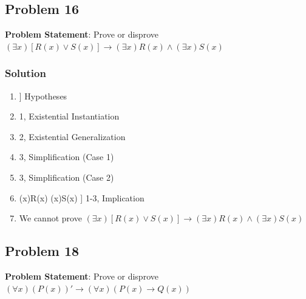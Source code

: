 \documentclass[12pt]{article}
\begin{document}
\subsection*{Problem 16}
\textbf{Problem Statement}: Prove or disprove \( (\exists x)[R(x)\lor S(x)]\rightarrow (\exists x)R(x)\land (\exists x)S(x) \)

\subsubsection*{Solution}
\begin{enumerate}[left=0em,labelwidth=4em,align=left]
    \item[\( (\exists x)[R(x) \lor S(x)] \)] \hfill Hypotheses
    \item[\( R(a) \lor S(a) \)] \hfill 1, Existential Instantiation
    \item[\( (\exists x)R(x) \lor (\exists x)S(x) \)] \hfill 2, Existential Generalization

    \item[\( (\exists x)R(x) \)] \hfill 3, Simplification (Case 1)
    \item[\( (\exists x)S(x) \)] \hfill 3, Simplification (Case 2)
    
    \item[\( (\exists x)[R(x) \lor S(x)] \rightarrow (\exists x)R(x) \lor (\exists x)S(x) \)] \hfill 1-3, Implication
    
    \item[\textbf{Note:}] \hfill We cannot prove \( (\exists x)[R(x)\lor S(x)]\rightarrow (\exists x)R(x)\land (\exists x)S(x) \)
\end{enumerate}


\newpage
\subsection*{Problem 18}
\textbf{Problem Statement}: Prove or disprove \( (\forall x)(P(x))' \rightarrow (\forall x)(P(x)\rightarrow Q(x)) \)
\end{document}
